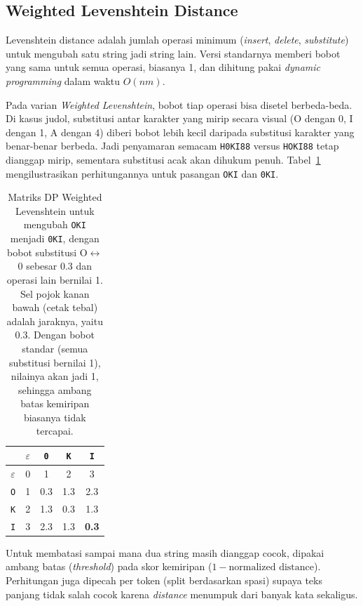 \documentclass[11pt,a4paper]{article}
\begin{document}
\subsection{Weighted Levenshtein Distance}
Levenshtein distance adalah jumlah operasi minimum (\textit{insert}, \textit{delete}, \textit{substitute}) untuk mengubah satu
string jadi string lain. Versi standarnya memberi bobot yang sama untuk semua operasi, biasanya 1, dan dihitung pakai
\textit{dynamic programming} dalam waktu $O(nm)$.

Pada varian \textit{Weighted Levenshtein}, bobot tiap operasi bisa disetel berbeda-beda. Di kasus judol, substitusi antar karakter
yang mirip secara visual (O dengan 0, I dengan 1, A dengan 4) diberi bobot lebih kecil daripada substitusi karakter yang
benar-benar berbeda. Jadi penyamaran semacam \texttt{H0KI88} versus \texttt{HOKI88} tetap dianggap mirip, sementara substitusi
acak akan dihukum penuh. Tabel~\ref{tab:lev-dp} mengilustrasikan perhitungannya untuk pasangan \texttt{OKI} dan \texttt{0KI}.

\begin{table}[H]
    \centering
    \caption{Matriks DP Weighted Levenshtein untuk mengubah \texttt{OKI} menjadi \texttt{0KI}, dengan bobot substitusi
    O$\leftrightarrow$0 sebesar 0.3 dan operasi lain bernilai 1. Sel pojok kanan bawah (cetak tebal) adalah jaraknya, yaitu 0.3.
    Dengan bobot standar (semua substitusi bernilai 1), nilainya akan jadi 1, sehingga ambang batas kemiripan biasanya tidak
    tercapai.}
    \label{tab:lev-dp}
    \begin{tabular}{c|cccc}
        \toprule
                      & $\varepsilon$ & \texttt{0} & \texttt{K} & \texttt{I} \\
        \midrule
        $\varepsilon$ & 0   & 1            & 2   & 3            \\
        \texttt{O}    & 1   & 0.3          & 1.3 & 2.3          \\
        \texttt{K}    & 2   & 1.3          & 0.3 & 1.3          \\
        \texttt{I}    & 3   & 2.3          & 1.3 & \textbf{0.3} \\
        \bottomrule
    \end{tabular}
\end{table}

Untuk membatasi sampai mana dua string masih dianggap cocok, dipakai ambang batas (\textit{threshold}) pada skor kemiripan
($1 - \text{normalized distance}$). Perhitungan juga dipecah per token (split berdasarkan spasi) supaya teks panjang tidak salah
cocok karena \textit{distance} menumpuk dari banyak kata sekaligus.
\end{document}
